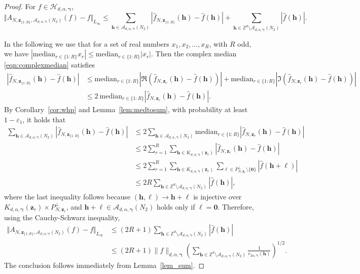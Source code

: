 \documentclass[a4paper,11pt]{article}
\newcommand{\bszero}{\boldsymbol{0}}
\newcommand{\bsh}{\boldsymbol{h}}
\newcommand{\bsl}{\boldsymbol{\ell}}
\newcommand{\bsz}{\boldsymbol{z}}
\newcommand{\bsgamma}{\boldsymbol{\gamma}}
\newcommand{\ZZ}{\mathbb{Z}}
\newcommand{\Acal}{\mathcal{A}}
\newcommand{\Hcal}{\mathcal{H}}
\newcommand{\abs}[1]{\left\vert#1\right\vert}
\begin{document}
\begin{proof}
    For $f\in \Hcal_{d,\alpha,\bsgamma}$,
    $$\Vert A_{N,\bsz_{\{1{:}R\}},\Acal_{d,\alpha,\bsgamma}(N_2)}(f)-f\Vert_{L_\infty}\leq \sum_{\bsh\in \Acal_{d,\alpha,\bsgamma}(N_2)} \abs{\widehat{f}_{N,\bsz_{\{1{:}R\}}}(\bsh)-\widehat{f}({\bsh})}+\sum_{\bsh\in \ZZ^d\setminus\Acal_{d,\alpha,\bsgamma}(N_2)} \abs{\widehat{f}({\bsh})}.$$

In the following we use that for a set of real numbers $x_1, x_2, \ldots, x_R$, with $R$ odd, we have $| \mathrm{median}_{r \in \{1:R\}} x_r | \le \mathrm{median}_{r \in \{1:R\}} |x_r|$. Then the complex median \eqref{eqn:complexmedian} satisfies
\begin{align*}
    \abs{\widehat{f}_{N,\bsz_{\{1{:}R\}}}(\bsh)-\widehat{f}({\bsh})} & \leq \mathrm{median}_{r\in\{1{:}R\}} \abs{\Re\left(\widehat{f}_{N,\bsz_{r}}(\bsh)-\widehat{f}({\bsh})\right)}+\mathrm{median}_{r\in\{1{:}R\}} \abs{\Im\left(\widehat{f}_{N,\bsz_{r}}(\bsh)-\widehat{f}({\bsh})\right)}\\
    & \leq 2 \ \mathrm{median}_{r\in\{1{:}R\}} \abs{\widehat{f}_{N,\bsz_{r}}(\bsh)-\widehat{f}({\bsh})}.
\end{align*}
By Corollary~\ref{cor:whp} and Lemma~\ref{lem:medtosum}, with probability at least $1-\varepsilon_1$, it holds that
    \begin{align*}
        \sum_{\bsh\in \Acal_{d,\alpha,\bsgamma}(N_2)} \abs{\widehat{f}_{N,\bsz_{\{1{:}R\}}}(\bsh)-\widehat{f}({\bsh})} & \leq 2\sum_{\bsh\in \Acal_{d,\alpha,\bsgamma}(N_2)}  \mathrm{median}_{r\in\{1{:}R\}} \abs{\widehat{f}_{N,\bsz_r}(\bsh)-\widehat{f}({\bsh})} \\
        & \leq 2 \sum_{r=1}^R \sum_{\bsh\in K_{d,\alpha,\bsgamma}(\bsz_r)} \abs{\widehat{f}_{N,\bsz_r}(\bsh)-\widehat{f}({\bsh})}\\
        & \leq 2 \sum_{r=1}^R \sum_{\bsh\in K_{d,\alpha,\bsgamma}(\bsz_r)} \sum_{\bsl\in P^\perp_{N,\bsz_r}\setminus\{\bszero\} }\abs{\widehat{f}({\bsh+\bsl})}\\
        & \leq 2R \sum_{\bsh\in \ZZ^d\setminus\Acal_{d,\alpha,\bsgamma}(N_2)} \abs{\widehat{f}({\bsh})},
    \end{align*}
    where the last inequality follows because $(\bsh,\bsl) \to \bsh+\bsl$ is injective over $K_{d,\alpha,\bsgamma}(\bsz_r)\times  P^\perp_{N,\bsz_r} $, and $\bsh+\bsl\in \Acal_{d,\alpha,\bsgamma}(N_2)$ holds only if $\bsl=\bszero$. Therefore, using the Cauchy-Schwarz inequality,
    \begin{align*}
        \Vert A_{N,\bsz_{\{1{:}R\}},\Acal_{d,\alpha,\bsgamma}(N_2)}(f)-f\Vert_{L_\infty} & \leq  (2 R+1)\sum_{\bsh\in \ZZ^d\setminus\Acal_{d,\alpha,\bsgamma}(N_2)} \abs{\widehat{f}({\bsh})} \\
        & \leq (2 R+1) \|f\|_{d,\alpha,\bsgamma} \left(\sum_{\bsh\in \ZZ^d\setminus\Acal_{d,\alpha,\bsgamma}(N_2)} \frac{1}{r_{2\alpha,\bsgamma}(\bsh)}\right)^{1/2}.
    \end{align*}
    The conclusion follows immediately from Lemma~\ref{lem_sum}.
\end{proof}
\end{document}
